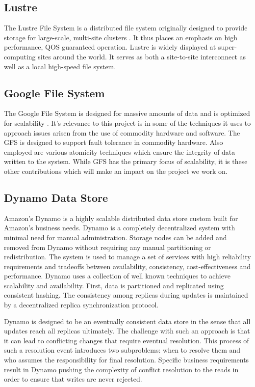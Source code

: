 \documentclass[11pt]{article}
\begin{document}
\subsection{Lustre}
The Lustre File System is a distributed file system originally designed
to provide storage for large-scale, multi-site clusters
\cite{Braam:LustreWhite}. It thus
places an emphasis on high performance, QOS guaranteed
operation. Lustre is widely displayed at super-computing sites around
the world. It serves as both a site-to-site interconnect as well as a
local high-speed file system.

\subsection{Google File System}
The Google File System is designed for massive amounts of data and is 
optimized for scalability \cite{Ghemawat:2003}.
It's relevance to this project is in some 
of the techniques it uses to approach issues arisen from the use of 
commodity hardware and software. The GFS is designed to support fault
tolerance in commodity hardware. Also employed are various atomicity
techniques which ensure the integrity of data written to the system.
While GFS has the primary focus of scalability, it is these other 
contributions which will make an impact on the project we work on.

\subsection{Dynamo Data Store}
Amazon's Dynamo is a highly scalable distributed data store custom
built for Amazon’s business needs. Dynamo is a completely
decentralized system with minimal need for manual administration. 
Storage nodes can be added and removed from Dynamo without requiring 
any manual partitioning or redistribution. The system is used to manage 
a set of services with high reliability requirements and tradeoffs 
between availability, consistency, cost-effectiveness and performance. 
Dynamo uses a collection of well known techniques to achieve scalability 
and availability. First, data is partitioned and replicated using 
consistent hashing. The consistency among replicas during updates is 
maintained by a decentralized replica synchronization protocol.

Dynamo is designed to be an eventually consistent data store in the
sense that all updates reach all replicas ultimately. The challenge
with such an approach is that it can lead to conflicting changes that
require eventual resolution. This process of such a resolution event
introduces two subproblems: when to resolve them and who assumes the
responsibility for final resolution. Specific business requirements
result in Dynamo pushing the complexity of conflict resolution to the
reads in order to ensure that writes are never rejected.
\end{document}
